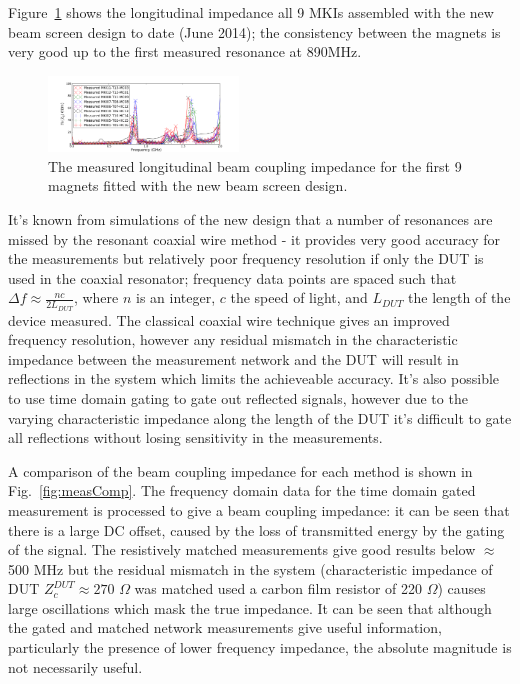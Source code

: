 \documentclass[a4paper,
              ]{jacow}
\begin{document}
Figure~\ref{fig:allNewMKIImp} shows the longitudinal impedance all 9 MKIs assembled with the new beam screen design to date (June 2014); the consistency between the magnets is very good up to the first measured resonance at 890MHz. 

\begin{figure}
\includegraphics[width=0.45\textwidth]{mkiNewDesignAll.pdf}
\caption{The measured longitudinal beam coupling impedance for the first 9 magnets fitted with the new beam screen design.}
\label{fig:allNewMKIImp}
\end{figure}

It's known from simulations of the new design \cite{DayThesis} that a number of resonances are missed by the resonant coaxial wire method - it provides very good accuracy for the measurements but relatively poor frequency resolution if only the DUT is used in the coaxial resonator; frequency data points are spaced such that $\Delta f \approx \frac{nc}{2L_{DUT}}$, where $n$ is an integer, $c$ the speed of light, and $L_{DUT}$ the length of the device measured. The classical coaxial wire technique gives an improved frequency resolution, however any residual mismatch in the characteristic impedance between the measurement network and the DUT will result in reflections in the system which limits the achieveable accuracy. It's also possible to use time domain gating to gate out reflected signals, however due to the varying characteristic impedance along the length of the DUT it's difficult to gate all reflections without losing sensitivity in the measurements.

A comparison of the beam coupling impedance for each method is shown in Fig.~\ref{fig:measComp}. The frequency domain data for the time domain gated measurement is processed to give a beam coupling impedance: it can be seen that there is a large DC offset, caused by the loss of transmitted energy by the gating of the signal. The resistively matched measurements give good results below $\approx$ 500 MHz but the residual mismatch in the system (characteristic impedance of DUT $Z_{c}^{DUT}\approx 270$ $\Omega$ was matched used a carbon film resistor of 220 $\Omega$) causes large oscillations which mask the true impedance. It can be seen that although the gated and matched network measurements give useful information, particularly the presence of lower frequency impedance, the absolute magnitude is not necessarily useful.
\end{document}
